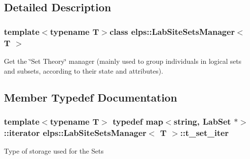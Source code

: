 \subsection{Detailed Description}
\subsubsection*{template$<$typename T$>$class elps\+::\+Lab\+Site\+Sets\+Manager$<$ T $>$}

Get the \char`\"{}\+Set Theory\char`\"{} manager (mainly used to group individuals in logical sets and subsets, according to their state and attributes). 

\subsection{Member Typedef Documentation}
\hypertarget{classelps_1_1_lab_site_sets_manager_aaff30965d876fdb4744cb5eb4436c4f7}{
\subsubsection[{t\+\_\+set\+\_\+iter}]{\setlength{\rightskip}{0pt plus 5cm}template$<$typename T$>$ typedef map$<$string, {\bf Lab\+Set} $\ast$$>$\+::iterator {\bf elps\+::\+Lab\+Site\+Sets\+Manager}$<$ T $>$\+::{\bf t\+\_\+set\+\_\+iter}}}\label{classelps_1_1_lab_site_sets_manager_aaff30965d876fdb4744cb5eb4436c4f7}
Type of storage used for the Sets 

